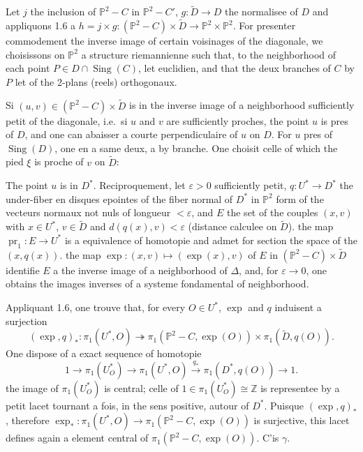 \documentclass[12pt,a4paper]{article}
\DeclareMathOperator{\Sing}{Sing}
\DeclareMathOperator{\pr}{pr}
\begin{document}
Let $j$ the inclusion of $\mathbb{P}^2 - C$ in $\mathbb{P}^2 - C'$, $g : \widetilde{D} \to D$ the normalisee of $D$ and appliquons 1.6 a $h = j \times g : (\mathbb{P}^2 - C) \times \widetilde{D} \to \mathbb{P}^2 \times \mathbb{P}^2$. For presenter commodement the inverse image of certain voisinages of the diagonale, we choisissons on $\mathbb{P}^2$ a structure riemannienne such that, to the neighborhood of each point $P \in D \cap \Sing(C)$, let euclidien, and that the deux branches of $C$ by $P$ let of the 2-plans (reels) orthogonaux.

Si $(u, v) \in (\mathbb{P}^2 - C) \times \widetilde{D}$ is in the inverse image of a neighborhood sufficiently petit of the diagonale, i.e.\ si $u$ and $v$ are sufficiently proches, the point $u$ is pres of $D$, and one can abaisser a courte perpendiculaire of $u$ on $D$. For $u$ pres of $\Sing(D)$, one en a same deux, a by branche. One choisit celle of which the pied $\xi$ is proche of $v$ on $\widetilde{D}$:

The point $u$ is in $D^*$. Reciproquement, let $\varepsilon > 0$ sufficiently petit, $q : U^* \to D^*$ the under-fiber en disques epointes of the fiber normal of $D^*$ in $\mathbb{P}^2$ form of the vecteurs normaux not nuls of longueur $< \varepsilon$, and $E$ the set of the couples $(x, v)$ with $x \in U^*$, $v \in \widetilde{D}$ and $d(q(x), v) < \varepsilon$ (distance calculee on $\widetilde{D}$). the map $\pr_1 : E \to U^*$ is a equivalence of homotopie and admet for section the space of the $(x, q(x))$. the map $\exp : (x, v) \mapsto (\exp(x), v)$ of $E$ in $(\mathbb{P}^2 - C) \times \widetilde{D}$ identifie $E$ a the inverse image of a neighborhood of $\Delta$, and, for $\varepsilon \to 0$, one obtains the images inverses of a systeme fondamental of neighborhood.

Appliquant 1.6, one trouve that, for every $O \in U^*$, $\exp$ and $q$ induisent a surjection
\[
(\exp, q)_* : \pi_1(U^*, O) \twoheadrightarrow \pi_1(\mathbb{P}^2 - C, \exp(O)) \times \pi_1(\widetilde{D}, q(O)).
\]
One dispose of a exact sequence of homotopie
\[
1 \longrightarrow \pi_1(U^*_O) \longrightarrow \pi_1(U^*, O) \xrightarrow{\;q_*\;} \pi_1(D^*, q(O)) \longrightarrow 1.
\]
the image of $\pi_1(U^*_O)$ is central; celle of $1 \in \pi_1(U^*_O) \cong \mathbb{Z}$ is representee by a petit lacet tournant a fois, in the sens positive, autour of $D^*$. Puisque $(\exp, q)_*$, therefore $\exp_* : \pi_1(U^*, O) \to \pi_1(\mathbb{P}^2 - C, \exp(O))$ is surjective, this lacet defines again a element central of $\pi_1(\mathbb{P}^2 - C, \exp(O))$. C'is $\gamma$.
\end{document}
